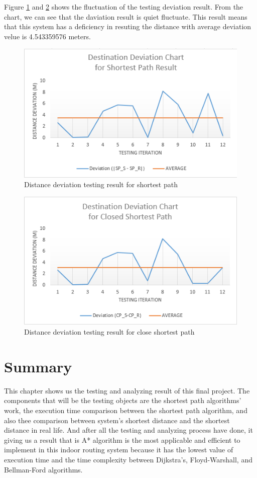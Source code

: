 \vspace{60mm}
Figure \ref{fig:graf3} and \ref{fig:graf8} shows the fluctuation of the testing deviation result. From the chart, we can see that the daviation result is quiet fluctuate. This result means that this system has a deficiency in resuting the distance with average deviation velue is 4.543359576 meters.


\begin{figure}[h!]
	\centering
	\includegraphics[scale=1]{graf4.PNG}
	\caption{Distance deviation testing result for shortest path
	}
	\label{fig:graf3}
\end{figure}

\begin{figure}[h!]
	\centering
	\includegraphics[scale=1]{graf5.PNG}
	\caption{Distance deviation testing result for close shortest path
	}
	\label{fig:graf8}
\end{figure}

\vspace{30mm}
\section{Summary}
This chapter shows us the testing and analyzing result of this final project. The components that will be the testing objects are the shortest path algorithms' work, the execution time comparison between the shortest path algorithm, and also thee comparison between system's shortest distance and the shortest distance in real life. And after all the testing and analyzing process have done, it giving us a result that is A* algorithm is the most applicable and efficient to implement in this indoor routing system because it has the lowest value of execution time and the time complexity between Dijkstra's, Floyd-Warshall, and Bellman-Ford algorithms.
